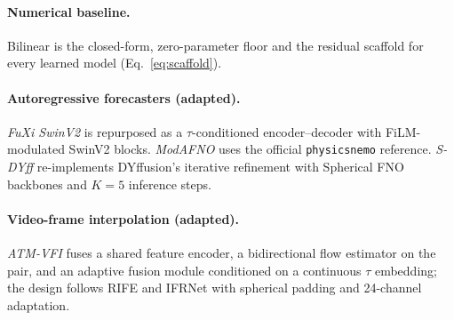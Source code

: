\documentclass[10pt,letterpaper,twocolumn]{article}
\begin{document}
\paragraph{Numerical baseline.} Bilinear is the closed-form,
zero-parameter floor and the residual scaffold for every learned model
(Eq.~\ref{eq:scaffold}).

\paragraph{Autoregressive forecasters (adapted).} \emph{FuXi SwinV2}
\cite{chen2023fuxi,liu2022swinv2} is repurposed as a $\tau$-conditioned
encoder--decoder with FiLM-modulated SwinV2 blocks. \emph{ModAFNO}
\cite{leinonen2024modafno,guibas2022afno} uses the official
\texttt{physicsnemo} reference. \emph{S-DYff} re-implements
DYffusion's iterative refinement with Spherical FNO
\cite{bonev2023sfno} backbones and $K{=}5$ inference steps.

\paragraph{Video-frame interpolation (adapted).} \emph{ATM-VFI} fuses a
shared feature encoder, a bidirectional flow estimator on the pair, and
an adaptive fusion module conditioned on a continuous $\tau$ embedding;
the design follows RIFE \cite{huang2022rife} and IFRNet
\cite{kong2022ifrnet} with spherical padding and 24-channel adaptation.
\end{document}
